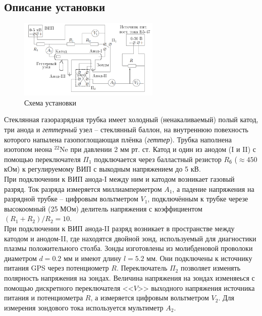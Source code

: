 \documentclass[12pt]{article}
\begin{document}
\subsection*{Описание установки}
\begin{figure}[H]
	\centering
	\includegraphics[width=0.6\textwidth]{1.png}
	\caption{Схема установки}
	\label{pic:scheme}
\end{figure}
Стеклянная газоразрядная трубка имеет холодный (ненакаливаемый) полый катод, три анода и \textit{геттерный} узел -- стеклянный баллон, на внутреннюю повехность которого напылена газопоглощающая плёнка (\textit{геттер}). Трубка наполнена изотопом неона $^22$Ne при давлении 2 мм рт. ст. Катод и один из анодом (I и II) с помощью переключателя $\Pi_1$ подключается через балластный резистор $R_\text{б}$ ($\approx 450$ кОм) к регулируемому ВИП с выкодным напряжением до 5 кВ.\\
При подключении к ВИП анода-I между ним и катодом возникает газовый разряд. Ток разряда измеряется миллиамперметром $A_1$, а падение напряжения на разрядной трубке -- цифровым вольтметром $V_1$, подключённым к трубке черезе высокоомный (25 МОм) делитель напряжения с коэффициентом $(R_1+R_2)/R_2 = 10$.\\
При подключении к ВИП анода-II разряд возникает в пространстве между катодом и анодом-II, где находятся двойной зонд, используемый для диагностики плазмы положительного столба. Зонды изготовлены из молибденовой проволоки диаметром $d = 0.2$ мм и имеют длину $l = 5.2$ мм. Они подключены к источнику питания GPS через потенциометр $R$. Переключатель $\Pi_2$ позволяет изменять полярность напряжения на зондах. Величина напряжения на зондах изменяеься с помощью дискретного переключателя <<$V$>> выходного напряжения источника питания и потенциометра $R$, а измеряется цифровым вольтметром $V_2$. Для измерения зондового тока используется мультиметр $A_2$.
\end{document}
